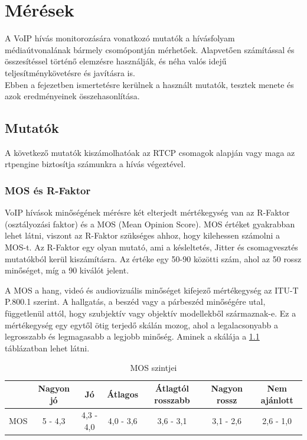 \chapter{Mérések}

A VoIP hívás monitorozására vonatkozó mutatók a hívásfolyam médiaútvonalának bármely 
csomópontján mérhetőek. Alapvetően számítással és összesítéssel történő elemzésre 
használják, és néha valós idejű teljesítménykövetésre és javításra is. \\

Ebben a fejezetben ismertetésre kerülnek a használt mutatók, tesztek menete és
azok eredményeinek összehasonlítása.

\section{Mutatók}

A következő mutatók kiszámolhatóak az RTCP csomagok alapján vagy maga az rtpengine
biztosítja számunkra a hívás végeztével.

\subsection{MOS és R-Faktor}

VoIP hívások minőségének mérésre két elterjedt mértékegység van az R-Faktor (osztályozási faktor)
és a MOS (Mean Opinion Score). MOS értéket gyakrabban lehet látni, viszont az R-Faktor szükséges
ahhoz, hogy kilehessen számolni a MOS-t. Az R-Faktor egy olyan mutató, ami a késleltetés, Jitter és
csomagvesztés mutatókból kerül kiszámításra. Az értéke egy 50-90 közötti szám, ahol 
az 50 rossz minőséget, míg a 90 kiválót jelent. 

A MOS a hang, videó és audiovizuális minőséget kifejező mértékegység az 
ITU-T P.800.1 szerint. A hallgatás, a beszéd vagy a párbeszéd minőségére utal, 
függetlenül attól, hogy szubjektív vagy objektív modellekből származnak-e. Ez a
mértékegység egy egytől ötig terjedő skálán mozog, ahol a legalacsonyabb a legrosszabb
és legmagasabb a legjobb minőség. Aminek a skálája a \ref{tab:mosValues} táblázatban 
lehet látni. 

\begin{table}[ht]
	\footnotesize
	\centering
	\begin{tabular}{l c c c c c c}
		\toprule
		 & Nagyon jó & Jó & Átlagos & Átlagtól rosszabb & Nagyon rossz & Nem ajánlott\\
		\midrule
		MOS & 5 - 4,3 & 4,3 - 4,0 & 4,0 - 3,6 & 3,6 - 3,1 & 3,1 - 2,6 & 2,6 - 1,0\\
		\bottomrule
	\end{tabular}
	\caption{MOS szintjei}
	\label{tab:mosValues}
\end{table}

